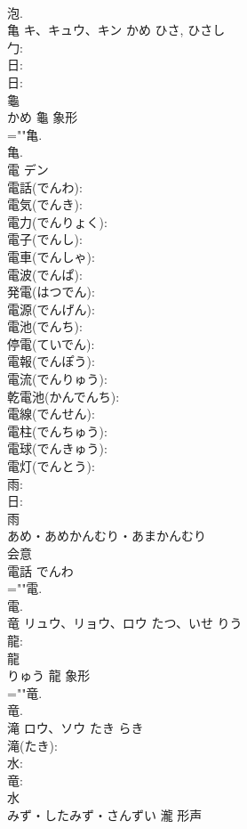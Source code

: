 \documentclass[8pt]{extreport}
\begin{document}
\begin{CJK}{UTF8}{min}
\\	泡.
\\	亀	キ、キュウ、キン	かめ	ひさ, ひさし	
\\	勹: 
\\	日: 
\\	日: 
\\	龜	
\\	かめ	龜	象形 
\\	=""亀.
\\	亀.
\\	電	デン			
\\	電話(でんわ): 
\\	電気(でんき): 
\\	電力(でんりょく): 
\\	電子(でんし): 
\\	電車(でんしゃ): 
\\	電波(でんぱ): 
\\	発電(はつでん): 
\\	電源(でんげん): 
\\	電池(でんち): 
\\	停電(ていでん): 
\\	電報(でんぽう): 
\\	電流(でんりゅう): 
\\	乾電池(かんでんち): 
\\	電線(でんせん): 
\\	電柱(でんちゅう): 
\\	電球(でんきゅう): 
\\	電灯(でんとう): 
\\	雨: 
\\	日: 
\\	雨	
\\	あめ・あめかんむり・あまかんむり	
\\	会意 
\\	電話 でんわ 
\\	=""電.
\\	電.
\\	竜	リュウ、リョウ、ロウ	たつ、いせ	りう	
\\	龍: 
\\	龍	
\\	りゅう	龍	象形 
\\	=""竜.
\\	竜.
\\	滝	ロウ、ソウ	たき	らき	
\\	滝(たき): 
\\	水: 
\\	竜: 
\\	水	
\\	みず・したみず・さんずい	瀧	形声 

\end{CJK}
\end{document}
